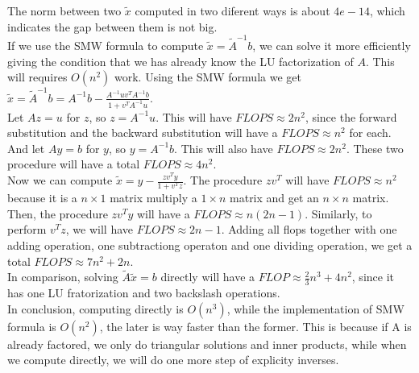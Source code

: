 \documentclass[a4paper]{article}
\begin{document}
The norm between two $\tilde{x}$ computed in two diferent ways is about $4e-14$, which indicates the gap between them is not big.\\
\indent If we use the SMW formula to compute $\tilde{x}=\tilde{A}^{-1}b$, we can solve it more efficiently giving the condition that we has already know the LU factorization of $A$. This will requires $O(n^{2})$ work. Using the SMW formula we get\\
$\tilde{x}=\tilde{A}^{-1}b=A^{-1}b-\frac{A^{-1}uv^{T}A^{-1}b}{1+v^{T}A^{-1}u}$.\\
Let $Az = u$ for $z$, so $z=A^{-1}u$. This will have $FLOPS\approx{2n^2}$, since the forward substitution and the backward substitution will have a $FLOPS\approx{n^2}$ for each. And let $Ay = b$ for $y$, so $y=A^{-1}b$. This will also have $FLOPS\approx{2n^2}$. These two procedure will have a total $FLOPS\approx{4n^2}$.\\
\indent Now we can compute $\tilde{x}= y-\frac{zv^{T}y}{1+v^{T}z}$. The procedure $zv^{T}$ will have $FLOPS\approx{n^2}$ because it is a $n\times{1}$ matrix multiply a $1\times{n}$ matrix and get an $n\times{n}$ matrix.
Then, the procedure $zv^{T}y$ will have a $FLOPS \approx{n(2n-1)}$. Similarly, to perform $v^{T}z$, we will have $FLOPS \approx{2n-1}$. Adding all flops together with one adding operation, one subtractiong operaton and one dividing operation, we get a total $FLOPS \approx{7n^{2} +2n}$.\\
\indent In comparison, solving $\tilde{A}\tilde{x}=b$ directly will have a $FLOP \approx{\frac{2}{3}n^{3}+4n^{2}}$, since it has one LU fratorization and two backslash operations.\\
\indent In conclusion, computing directly is $O(n^3)$, while the implementation of SMW formula is $O(n^2)$, the later is way faster than the former. This is because if A is already factored, we only do triangular solutions and inner products, while when we compute directly, we will do one more step of explicity inverses.
\end{document}
